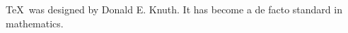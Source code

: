 \documentclass[a4paper,10pt]{article}
\begin{document}
\TeX\ was designed by Donald E. Knuth.
It has become a de facto standard in mathematics.
\end{document}
